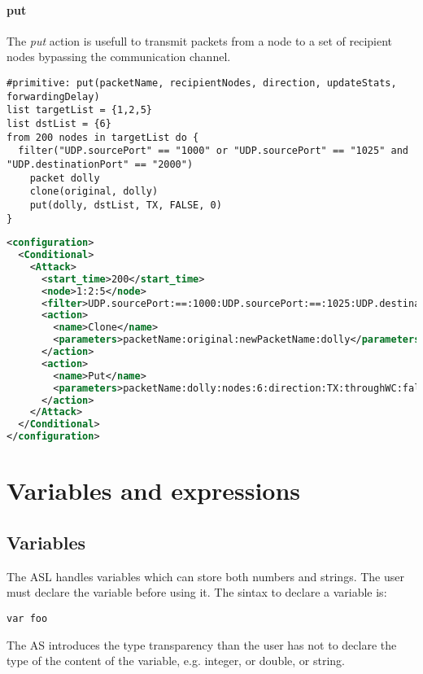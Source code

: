 \paragraph{put}
The \emph{put} action is usefull to transmit packets from a node to a set of recipient nodes bypassing the communication channel.
%
\begin{lstlisting}[language={asl},caption={ASL put example}]
#primitive: put(packetName, recipientNodes, direction, updateStats, forwardingDelay)
list targetList = {1,2,5}
list dstList = {6}
from 200 nodes in targetList do {
  filter("UDP.sourcePort" == "1000" or "UDP.sourcePort" == "1025" and "UDP.destinationPort" == "2000")
    packet dolly
    clone(original, dolly)
    put(dolly, dstList, TX, FALSE, 0)
}
\end{lstlisting}
%
\begin{lstlisting}[language={xml},caption={Interpreter output}]
<configuration>
  <Conditional>
    <Attack>
      <start_time>200</start_time>
      <node>1:2:5</node>
      <filter>UDP.sourcePort:==:1000:UDP.sourcePort:==:1025:UDP.destinationPort:==:2000:AND:OR</filter>
      <action>
        <name>Clone</name>          
        <parameters>packetName:original:newPacketName:dolly</parameters>                        
      </action>
      <action>
        <name>Put</name>
        <parameters>packetName:dolly:nodes:6:direction:TX:throughWC:false:delay:0</parameters>
      </action>
    </Attack>
  </Conditional>
</configuration>
\end{lstlisting}



\section{Variables and expressions}

\subsection{Variables}
The ASL handles variables which can store both numbers and strings. The user must declare the variable before using it. The sintax to declare a variable is:
%
\begin{lstlisting}[language={asl}, caption={Sintax to declare a variable}]
var foo
\end{lstlisting}
%
The AS introduces the type transparency than the user has not to declare the type of the content of the variable, e.g. integer, or double, or string. 

